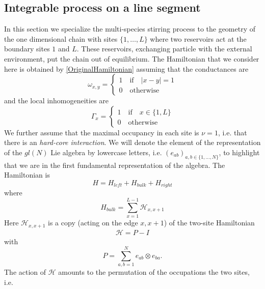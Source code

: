 \documentclass[10pt]{article}
\numberwithin{equation}{section}
\numberwithin{equation}{subsection}
\newcommand{\id}{I}
\begin{document}
\subsection{Integrable process on a line segment}\label{subsection-description-process-LINE}
In this section we specialize the multi-species stirring process to the geometry of the one dimensional chain with sites $\{1,\ldots,L\}$ where two reservoirs act at the boundary sites $1$ and $L$. These reservoirs, exchanging particle with the external environment, put the chain out of equilibrium. The Hamiltonian that we consider here is obtained by \eqref{OriginalHamiltonian} assuming that the conductances are
\begin{equation}
	\omega_{x,y}=\begin{cases}
		1 \quad \text{if}\quad |x-y|=1\\
		0\quad \text{otherwise}
	\end{cases}
\end{equation}
and the local inhomogeneities are
\begin{equation}
	\Gamma_{x}=\begin{cases}
		1\quad \text{if} \quad x\in \{1,L\}\\
		0\quad \text{otherwise}
	\end{cases}
\end{equation}
We further assume that the maximal occupancy in each site is $\nu=1$, i.e. that there is an \textit{hard-core interaction}.
We will denote the element of the representation of the $gl(N)$ Lie algebra by lowercase letters, i.e. $(e_{ab})_{a,b\in\{1,\ldots,N\}}$, to highlight that we are in the first fundamental representation of the algebra.
The Hamiltonian is
\begin{equation}\label{hamiltonian}
	H=H_{left}+H_{bulk}+H_{right}
\end{equation}
where
\begin{equation}
	H_{bulk}=\sum_{x=1}^{L-1}\mathcal{H}_{x,x+1}
\end{equation}
Here $\mathcal{H}_{x,x+1}$  is a copy (acting on the edge $x,x+1$) of the two-site Hamiltonian
\begin{equation}\label{H-corsivo}
	\begin{split}
		\mathcal{H}=P-\id
	\end{split}
\end{equation}
with 
\begin{equation}
	P=\sum_{a,b=1}^Ne_{ab}\otimes e_{ba}.
\end{equation} 
The action of $\mathcal{H}$ amounts to the permutation of the occupations the two sites, i.e.
\end{document}
